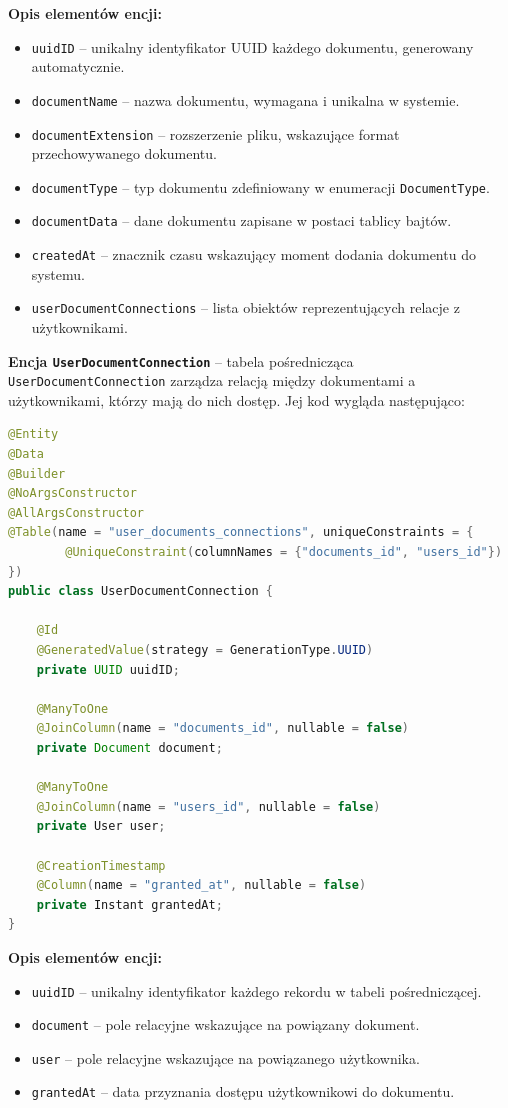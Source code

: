 \textbf{Opis elementów encji:}
\begin{itemize}
    \item \texttt{uuidID} -- unikalny identyfikator UUID każdego dokumentu, generowany automatycznie.
    \item \texttt{documentName} -- nazwa dokumentu, wymagana i unikalna w systemie.
    \item \texttt{documentExtension} -- rozszerzenie pliku, wskazujące format przechowywanego dokumentu.
    \item \texttt{documentType} -- typ dokumentu zdefiniowany w enumeracji \texttt{DocumentType}.
    \item \texttt{documentData} -- dane dokumentu zapisane w postaci tablicy bajtów.
    \item \texttt{createdAt} -- znacznik czasu wskazujący moment dodania dokumentu do systemu.
    \item \texttt{userDocumentConnections} -- lista obiektów reprezentujących relacje z użytkownikami.
\end{itemize}

\textbf{Encja \texttt{UserDocumentConnection}} -- tabela pośrednicząca \texttt{UserDocumentConnection} zarządza relacją między dokumentami a użytkownikami, którzy mają do nich dostęp. Jej kod wygląda następująco:

\begin{lstlisting}[language=Java, style=JavaStyle, caption=Encja \texttt{UserDocumentConnection}]
@Entity
@Data
@Builder
@NoArgsConstructor
@AllArgsConstructor
@Table(name = "user_documents_connections", uniqueConstraints = {
        @UniqueConstraint(columnNames = {"documents_id", "users_id"})
})
public class UserDocumentConnection {

    @Id
    @GeneratedValue(strategy = GenerationType.UUID)
    private UUID uuidID;

    @ManyToOne
    @JoinColumn(name = "documents_id", nullable = false)
    private Document document;

    @ManyToOne
    @JoinColumn(name = "users_id", nullable = false)
    private User user;

    @CreationTimestamp
    @Column(name = "granted_at", nullable = false)
    private Instant grantedAt;
}
\end{lstlisting}

\textbf{Opis elementów encji:}
\begin{itemize}
    \item \texttt{uuidID} -- unikalny identyfikator każdego rekordu w tabeli pośredniczącej.
    \item \texttt{document} -- pole relacyjne wskazujące na powiązany dokument.
    \item \texttt{user} -- pole relacyjne wskazujące na powiązanego użytkownika.
    \item \texttt{grantedAt} -- data przyznania dostępu użytkownikowi do dokumentu.
\end{itemize}

